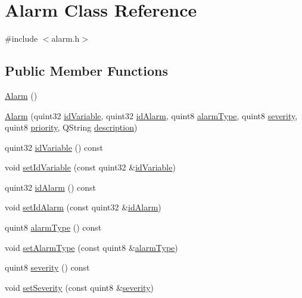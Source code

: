 \hypertarget{class_alarm}{}\section{Alarm Class Reference}
\label{class_alarm}


{\ttfamily \#include $<$alarm.\+h$>$}

\subsection*{Public Member Functions}
\begin{DoxyCompactItemize}
\item 
\hyperlink{class_alarm_ac2384a1b3e766a9d8f93b2fb269b636a}{Alarm} ()
\item 
\hyperlink{class_alarm_a6f1d99b20b4337ece076f25c63122a84}{Alarm} (quint32 \hyperlink{class_alarm_a258db44e82ce71df9af740dbf9ab1d90}{id\+Variable}, quint32 \hyperlink{class_alarm_a6d6e5c1d1e8f493ba09d8b0da2388104}{id\+Alarm}, quint8 \hyperlink{class_alarm_a563e08e66eeb09081f60f5f5456a52da}{alarm\+Type}, quint8 \hyperlink{class_alarm_a78f7605e7e53d136b334efd45d34f9b8}{severity}, quint8 \hyperlink{class_alarm_a99cbb898f52702c162ef53bd768b7fef}{priority}, Q\+String \hyperlink{class_alarm_a5c58da564d9fea20fbb8265d5b593880}{description})
\item 
quint32 \hyperlink{class_alarm_a258db44e82ce71df9af740dbf9ab1d90}{id\+Variable} () const 
\item 
void \hyperlink{class_alarm_a85bf73bec6d56c37aad870a37e867f85}{set\+Id\+Variable} (const quint32 \&\hyperlink{class_alarm_a258db44e82ce71df9af740dbf9ab1d90}{id\+Variable})
\item 
quint32 \hyperlink{class_alarm_a6d6e5c1d1e8f493ba09d8b0da2388104}{id\+Alarm} () const 
\item 
void \hyperlink{class_alarm_a5be43cc46df41dca270aff773fef9716}{set\+Id\+Alarm} (const quint32 \&\hyperlink{class_alarm_a6d6e5c1d1e8f493ba09d8b0da2388104}{id\+Alarm})
\item 
quint8 \hyperlink{class_alarm_a563e08e66eeb09081f60f5f5456a52da}{alarm\+Type} () const 
\item 
void \hyperlink{class_alarm_a46a58978ab9a8c1a6886442900020b8c}{set\+Alarm\+Type} (const quint8 \&\hyperlink{class_alarm_a563e08e66eeb09081f60f5f5456a52da}{alarm\+Type})
\item 
quint8 \hyperlink{class_alarm_a78f7605e7e53d136b334efd45d34f9b8}{severity} () const 
\item 
void \hyperlink{class_alarm_a2f826563d63e6c8742e4966b8c71952d}{set\+Severity} (const quint8 \&\hyperlink{class_alarm_a78f7605e7e53d136b334efd45d34f9b8}{severity})

\end{DoxyCompactItemize}
